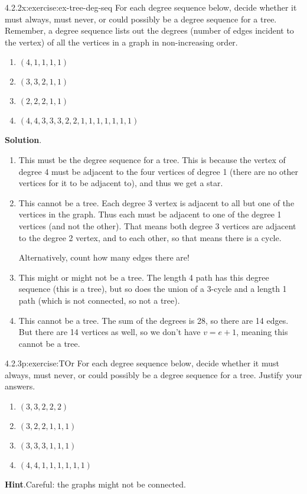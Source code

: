 \documentclass[twoside,11pt,]{book}
\newcommand{\blocktitlefont}{\relax}
\numberwithin{equation}{chapter}
\begin{document}
\begin{divisionsolution}{4.2.2}{}{x:exercise:ex-tree-deg-seq}%
For each degree sequence below, decide whether it must always, must never, or could possibly be a degree sequence for a tree. Remember, a degree sequence lists out the degrees (number of edges incident to the vertex) of all the vertices in a graph in non-increasing order.%
\begin{enumerate}[label=(\alph*)]
\item{}\((4,1,1,1,1)\)%
\item{}\((3,3,2,1,1)\)%
\item{}\((2,2,2,1,1)\)%
\item{}\((4, 4, 3, 3, 3, 2, 2, 1, 1, 1, 1, 1, 1, 1)\)%
\end{enumerate}
%
\par\smallskip%
\noindent\textbf{\blocktitlefont Solution}.\quad{}%
\begin{enumerate}[label=(\alph*)]
\item{}This must be the degree sequence for a tree. This is because the vertex of degree 4 must be adjacent to the four vertices of degree 1 (there are no other vertices for it to be adjacent to), and thus we get a star.%
\item{}This cannot be a tree. Each degree 3 vertex is adjacent to all but one of the vertices in the graph. Thus each must be adjacent to one of the degree 1 vertices (and not the other). That means both degree 3 vertices are adjacent to the degree 2 vertex, and to each other, so that means there is a cycle.%
\par
Alternatively, count how many edges there are!%
\item{}This might or might not be a tree. The length 4 path has this degree sequence (this is a tree), but so does the union of a 3-cycle and a length 1 path (which is not connected, so not a tree).%
\item{}This cannot be a tree. The sum of the degrees is 28, so there are 14 edges. But there are 14 vertices as well, so we don't have \(v = e+1\), meaning this cannot be a tree.%
\end{enumerate}
%
\end{divisionsolution}%
\begin{divisionsolution}{4.2.3}{}{p:exercise:TOr}%
For each degree sequence below, decide whether it must always, must never, or could possibly be a degree sequence for a tree.  Justify your answers.%
\begin{enumerate}[label=(\alph*)]
\item{}\((3, 3, 2, 2, 2)\)%
\item{}\((3, 2, 2, 1, 1, 1)\)%
\item{}\((3, 3, 3, 1, 1, 1)\)%
\item{}\((4, 4, 1, 1, 1, 1, 1, 1)\)%
\end{enumerate}
%
\par\smallskip%
\noindent\textbf{\blocktitlefont Hint}.\quad{}Careful: the graphs might not be connected.%
\end{divisionsolution}%
\end{document}
